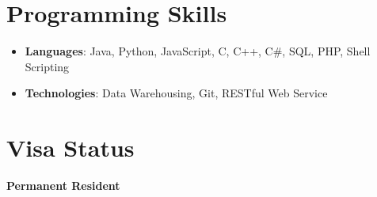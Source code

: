 \documentclass[letterpaper,11pt]{article}
\newcommand{\resumeSubHeadingListStart}{\begin{itemize}[leftmargin=*]}
\newcommand{\resumeSubHeadingListEnd}{\end{itemize}}
\begin{document}
%
\section{Programming Skills}
 \resumeSubHeadingListStart
   \item{
     \textbf{Languages}{: Java, Python, JavaScript, C, C++, C\#, SQL, PHP, Shell Scripting}     
   }
   \item{
    \textbf{Technologies}{: Data Warehousing, Git, RESTful Web Service}
   }
 \resumeSubHeadingListEnd

 \section{Visa Status}
 \textbf{Permanent Resident} 


\end{document}
